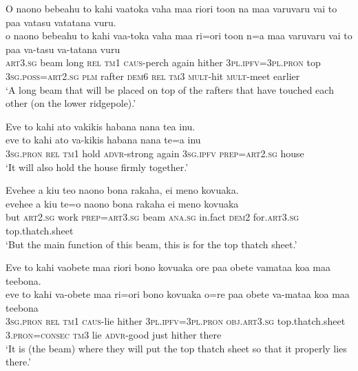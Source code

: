 \ea\label{ex:text11-35}
O naono bebeahu to kahi vaatoka vaha maa riori toon na maa varuvaru vai to paa vatasu vatatana vuru.\\
\gll o	naono	bebeahu	to	kahi	vaa-toka	vaha	maa	ri=ori	toon	n=a	maa	varuvaru	vai	to	paa	va-tasu	va-tatana	vuru\\
     \textsc{art}3.\textsc{sg}	beam	long	\textsc{rel}	\textsc{tm}1	\textsc{caus}-perch	again	hither	3\textsc{pl}.\textsc{ipfv}=3\textsc{pl}.\textsc{pron}	top	3\textsc{sg}.\textsc{poss}=\textsc{art}2.\textsc{sg}	\textsc{plm}	rafter	\textsc{dem}6	\textsc{rel}	\textsc{tm}3	\textsc{mult}-hit	\textsc{mult}-meet	earlier\\
\glt `A long beam that will be placed on top of the rafters that have touched each other (on the lower ridgepole).'
\z

\ea\label{ex:text11-36}
Eve to kahi ato vakikis habana nana tea inu.\\
\gll eve	to	kahi	ato	va-kikis	habana	nana	te=a	inu\\
     3\textsc{sg}.\textsc{pron}	\textsc{rel}	\textsc{tm}1	hold	\textsc{advr}-strong	again	3\textsc{sg}.\textsc{ipfv}	\textsc{prep}=\textsc{art}2.\textsc{sg}	house\\
\glt `It will also hold the house firmly together.'
\z

\ea\label{ex:text11-37}
Evehee a kiu teo naono bona rakaha, ei meno kovuaka.\\
\gll evehee	a	kiu	te=o	naono	bona	rakaha	ei	meno	kovuaka\\
     but	\textsc{art}2.\textsc{sg}	work	\textsc{prep}=\textsc{art}3.\textsc{sg}	beam	\textsc{ana}.\textsc{sg}	in.fact	\textsc{dem}2	for.\textsc{art}3.\textsc{sg}	top.thatch.sheet\\
\glt `But the main function of this beam, this is for the top thatch sheet.'
\z

\ea\label{ex:text11-38}
Eve to kahi vaobete maa riori bono kovuaka ore paa obete vamataa koa maa teebona.\\
\gll eve	to	kahi	va-obete	maa	ri=ori	bono	kovuaka	o=re	paa	obete	va-mataa	koa	maa	teebona\\
     3\textsc{sg}.\textsc{pron}	\textsc{rel}	\textsc{tm}1	\textsc{caus}-lie	hither	3\textsc{pl}.\textsc{ipfv}=3\textsc{pl}.\textsc{pron}	\textsc{obj}.\textsc{art}3.\textsc{sg}	top.thatch.sheet	3.\textsc{pron}=\textsc{consec}	\textsc{tm}3	lie	\textsc{advr}-good	just	hither	there\\
\glt `It is (the beam) where they will put the top thatch sheet so that it properly lies there.'
\z

